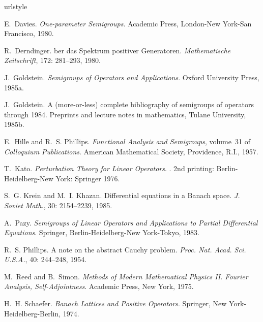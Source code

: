 \begin{thebibliography}{11}
\providecommand{\natexlab}[1]{#1}
\providecommand{\url}[1]{\texttt{#1}}
\expandafter\ifx\csname urlstyle\endcsname\relax
  \providecommand{\doi}[1]{doi: #1}\else
  \providecommand{\doi}{doi: \begingroup \urlstyle{rm}\Url}\fi

E.~Davies.
\newblock \emph{One-parameter Semigroups}.
\newblock Academic Press, London-New York-San Francisco, 1980.

R.~Derndinger.
ber das {S}pektrum positiver {G}eneratoren.
\newblock \emph{Mathematische Zeitschrift}, 172: 281--293, 1980.

\bibitem[Goldstein(1985{\natexlab{a}})]{goldstein:1985a}
J.~Goldstein.
\newblock \emph{Semigroups of Operators and Applications}.
\newblock Oxford University Press, 1985{\natexlab{a}}.

\bibitem[Goldstein(1985{\natexlab{b}})]{goldstein:1985b}
J.~Goldstein.
\newblock A (more-or-less) complete bibliography of semigroups of operators
  through 1984.
\newblock Preprints and lecture notes in mathematics, Tulane University,
  1985{\natexlab{b}}.

E.~Hille and R.~S. Phillips.
\newblock \emph{Functional Analysis and Semigroups}, volume~31 of
  \emph{Colloquium Publications}.
\newblock American Mathematical Society, Providence, R.I., 1957.

T.~Kato.
\newblock \emph{Perturbation Theory for Linear Operators}.
.
\newblock 2nd printing: Berlin-Heidelberg-New York: Springer 1976.

S.~G. Krein and M.~I. Khazan.
\newblock Differential equations in a {Banach} space.
\newblock \emph{J. Soviet Math.}, 30: 2154--2239, 1985.

A.~Pazy.
\newblock \emph{Semigroups of Linear Operators and Applications to Partial
  Differential Equations}.
\newblock Springer, Berlin-Heidelberg-New York-Tokyo, 1983.

R.~S. Phillips.
\newblock A note on the abstract {Cauchy} problem.
\newblock \emph{Proc. Nat. Acad. Sci. U.S.A.}, 40: 244--248, 1954.

M.~Reed and B.~Simon.
\newblock \emph{Methods of Modern Mathematical Physics {II}. {Fourier}
  Analysis, Self-Adjointness}.
\newblock Academic Press, New York, 1975.

H.~H. Schaefer.
\newblock \emph{Banach Lattices and Positive Operators}.
\newblock Springer, New York-Heidelberg-Berlin, 1974.

\end{thebibliography}

